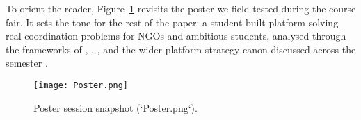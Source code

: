 \documentclass[12pt,a4paper]{article}
\begin{document}
To orient the reader, Figure~\ref{fig:intro-showcase} revisits the poster we field-tested during the course fair. It sets the tone for the rest of the paper: a student-built platform solving real coordination problems for NGOs and ambitious students, analysed through the frameworks of \citet{Choudary2016}, \citet{Srnicek2017}, \citet{Reillier2017}, and the wider platform strategy canon discussed across the semester \citep{Lecture01,Lecture03,Lecture05}.

\begin{figure}[h]
  \centering
  \texttt{[image: Poster.png]}
  \caption{Poster session snapshot (`Poster.png`).}
  \label{fig:intro-showcase}
\end{figure}












\newpage


\end{document}
